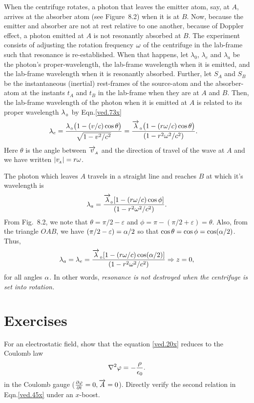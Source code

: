 When the centrifuge rotates, a photon that leaves the 
emitter  atom, say, at $A$, arrives at the  absorber 
atom 
(see Figure~8.2) when it is at  $B$. Now, because the 
emitter and absorber are not at rest relative to one 
another, because of Doppler effect, {a photon emitted 
at 
$A$ 
is not resonantly absorbed at $B$}. The experiment 
consists 
of adjusting the rotation frequency ${\omega}$ of the 
centrifuge 
in the lab-frame such that resonance is 
re-established. 
When 
that happens, let $\lambda_0$,   $\lambda_e$ and 
$\lambda_a$ 
be the photon's proper-wavelength, the lab-frame 
wavelength 
when it is emitted, and the lab-frame wavelength when 
it is 
resonantly absorbed. Further, let $S_A$ and $S_B$ be 
the 
instantaneous (inertial) rest-frames of the source-atom 
and 
the absorber-atom at the instants $t_A$ and $t_B$ in 
the 
lab-frame when they are at $A$ and $B$. Then, the 
lab-frame 
wavelength of the photon when it is emitted at $A$ is 
related to its proper wavelength $\lambda_{_{\hspace*{-1.5pt}{\,\,0}}}$ 
by 
Eqn.\eqref{ved.73x}
\begin{align}\label{ved.71}
\lambda_e&=\frac{\lambda_{_{\hspace*{-1.5pt}{\,\,0}}}
\big(1-(v/c)\cos\theta\big)}
{\sqrt{1-v^2/c^2}}=\frac{\overrightarrow{\lambda}_{_{\hspace*{-1.5pt}{\,\,0}}}
\big(1-(r{\omega}/c)\cos\theta\big)}{(1-r^2{\omega}^2/c^2)}.
\end{align}
Here $\theta$ is the angle between $\overrightarrow{v}_{_{\hspace*{-1.5pt}{A}}}$ 
and the direction of travel of the wave at $A$ and we 
have written 
$|v_{_{\hspace*{-1.5pt}{A}}}|=r{\omega}$.

The photon which leaves $A$ travels in a straight line
and   reaches  $B$ at which it's wavelength is
\begin{align}\label{ved.72}
\lambda_a=\frac{\overrightarrow{\lambda}_{_{\hspace*{-1.5pt}{\,0}}}
[ 1-(r{\omega}/c)\cos\phi]}{(1-r^2{\omega}^2/c^2)}.
\end{align}
From Fig.~8.2, we note that  $\theta = 
\pi/2-\varepsilon$ 
and   $\phi = \pi-(\pi/2+\varepsilon) = \theta$. Also, 
from the triangle $OAB$, we have $(\pi/2-\varepsilon) 
={\alpha}/2$ so that $\cos\theta=\cos\phi=\cos({\alpha}/2)$. 
Thus,
\begin{align}\label{ved.73}
\lambda_a =\lambda_e=\frac{\overrightarrow{\lambda}_{_{\hspace*{-1.5pt}{\,\,0}}}
[1-(r{\omega}/c)\cos({\alpha}/2)]}
{(1-r^2{\omega}^2/c^2)}\Rightarrow z=0,
\end{align}
for all angles ${\alpha}$. In other words, \textsl{resonance is 
not destroyed when the centrifuge is set into rotation.}

\section*{Exercises}
\exise For an electrostatic field,  show that  
the equation \eqref{ved.20x} reduces to the Coulomb law 
\begin{align}
\nabla^2 \varphi=-\frac{\rho}{\epsilon_0}.
\end{align}
in the Coulomb gauge ($\frac{{\partial}{\varphi}}{{\partial}{t}}=0, \overrightarrow{A}=0$).
\exise Directly verify the second relation in  
Eqn.\eqref{ved.45x} under an $x$-boost.


